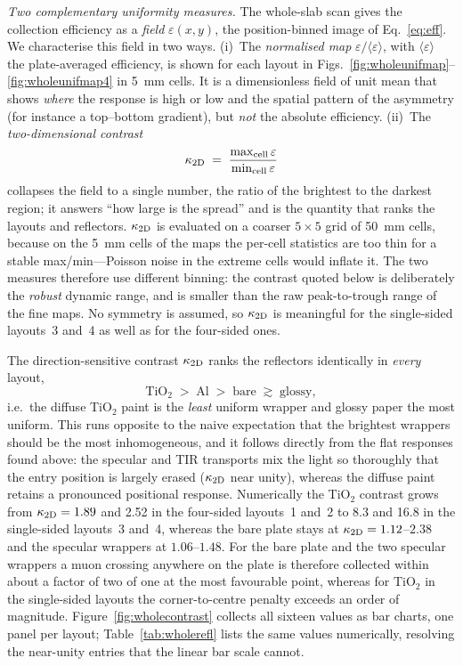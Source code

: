 \documentclass[11pt,a4paper]{article}
\begin{document}
\emph{Two complementary uniformity measures.}  The whole-slab scan gives the
collection efficiency as a \emph{field} $\varepsilon(x,y)$, the position-binned
image of Eq.~\ref{eq:eff}.  We characterise this field in two ways.
(i)~The \emph{normalised map} $\varepsilon/\langle\varepsilon\rangle$, with
$\langle\varepsilon\rangle$ the plate-averaged efficiency, is shown for each
layout in Figs.~\ref{fig:wholeunifmap}--\ref{fig:wholeunifmap4} in
\SI{5}{\milli\meter} cells.  It is a dimensionless field of unit mean that shows
\emph{where} the response is high or low and the spatial pattern of the
asymmetry (for instance a top--bottom gradient), but \emph{not} the absolute
efficiency.
(ii)~The \emph{two-dimensional contrast}
\[
  \kappa_{\rm 2D} \;=\; \frac{\max_{\rm cell}\varepsilon}{\min_{\rm cell}\varepsilon}
\]
collapses the field to a single number, the ratio of the brightest to the
darkest region; it answers ``how large is the spread'' and is the quantity that
ranks the layouts and reflectors.  $\kappa_{\rm 2D}$ is evaluated on a coarser
$5\times5$ grid of \SI{50}{\milli\meter} cells, because on the
\SI{5}{\milli\meter} cells of the maps the per-cell statistics are too thin for
a stable max/min---Poisson noise in the extreme cells would inflate it.  The two
measures therefore use different binning: the contrast quoted below is
deliberately the \emph{robust} dynamic range, and is smaller than the raw
peak-to-trough range of the fine maps.  No symmetry is assumed, so
$\kappa_{\rm 2D}$ is meaningful for the single-sided layouts~3 and~4 as well as
for the four-sided ones.

The direction-sensitive contrast $\kappa_{\rm 2D}$ ranks the reflectors
identically in \emph{every} layout,
\[
\text{TiO}_2 \;>\; \text{Al} \;>\; \text{bare} \;\gtrsim\; \text{glossy},
\]
i.e.\ the diffuse TiO$_2$ paint is the \emph{least} uniform wrapper and glossy
paper the most uniform. This runs opposite to the naive expectation that the
brightest wrappers should be the most inhomogeneous, and it follows directly
from the flat responses found above: the specular and TIR transports mix the
light so thoroughly that the entry position is largely erased
($\kappa_{\rm 2D}$ near unity), whereas the diffuse paint retains a pronounced
positional response. Numerically the TiO$_2$ contrast grows from
$\kappa_{\rm 2D} = \num{1.89}$ and \num{2.52} in the four-sided layouts~1 and~2
to \num{8.3} and \num{16.8} in the single-sided layouts~3 and~4, whereas the
bare plate stays at $\kappa_{\rm 2D} = \num{1.12}$--$\num{2.38}$ and the
specular wrappers at $\num{1.06}$--$\num{1.48}$. For the bare plate and the two
specular wrappers a muon crossing anywhere on the plate is therefore collected
within about a factor of two of one at the most favourable point, whereas for
TiO$_2$ in the single-sided layouts the corner-to-centre penalty exceeds an
order of magnitude. Figure~\ref{fig:wholecontrast} collects all sixteen values
as bar charts, one panel per layout; Table~\ref{tab:wholerefl} lists the same
values numerically, resolving the near-unity entries that the linear bar scale
cannot.
\end{document}
